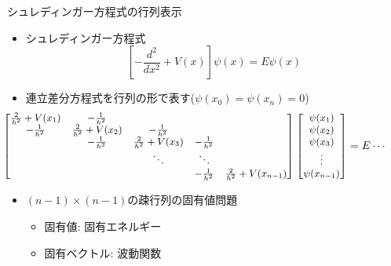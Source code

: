 \begin{frame}[t,fragile]{シュレディンガー方程式の行列表示}
  \begin{itemize}
  \item シュレディンガー方程式
    \[
    [-\frac{d^2}{dx^2}+V(x)]\psi(x) = E \psi(x)
    \]
  \item 連立差分方程式を行列の形で表す($\psi(x_0)=\psi(x_n)=0$)
    \[\begin{small}\hspace*{-4em}
    \begin{bmatrix}
      \frac{2}{h^2}+V(x_1) & -\frac{1}{h^2} \\
      -\frac{1}{h^2} & \frac{2}{h^2}+V(x_2) & -\frac{1}{h^2} \\
      & -\frac{1}{h^2} & \frac{2}{h^2}+V(x_3) & -\frac{1}{h^2} \\
      & & \ddots & \ddots \\
      & & & -\frac{1}{h^2} & \frac{2}{h^2}+V(x_{n-1}) \\
    \end{bmatrix}
    \begin{bmatrix}
      \psi(x_1) \\
      \psi(x_2) \\
      \psi(x_3) \\
      \vdots \\
      \psi(x_{n-1}) \\
    \end{bmatrix}
    = E\cdots %
    \end{small}
    \]
  \item $(n-1) \times (n-1)$の疎行列の固有値問題
    \begin{itemize}
    \item 固有値: 固有エネルギー
    \item 固有ベクトル: 波動関数
    \end{itemize}
  \end{itemize}
\end{frame}
